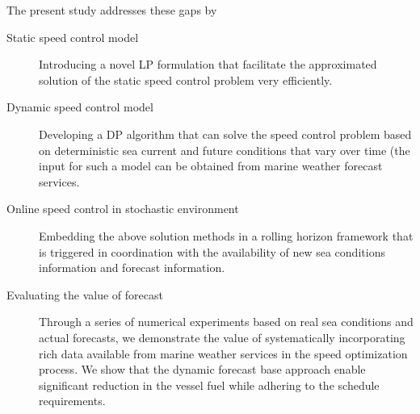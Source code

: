 \documentclass[review,authoryear]{elsarticle}  %
\newcommand{\revadd}[1]{\textcolor{blue}{#1}}
\newcommand{\revdel}[1]{\textcolor{red}{\sout{#1}}}
\newcommand{\revrep}[2]{\revdel{#2}\revadd{#1}}
\begin{document}
The present study addresses these gaps by %


\begin{description}
    \item[Static speed control model]  Introducing a novel LP formulation that facilitate the approximated solution of the static speed control problem very efficiently.
    \item[Dynamic speed control model]  Developing a DP algorithm that can solve the speed control problem based on deterministic sea current and future conditions that vary over time  (the input for such a model can be obtained from marine weather forecast services.
    \item[Online speed control in stochastic environment] Embedding the above solution methods in a rolling horizon framework that is triggered in coordination with the availability of new sea conditions information and forecast information.
    \item[Evaluating the value of forecast]  Through a series of numerical experiments based on real sea conditions and actual forecasts, we demonstrate the value of systematically incorporating rich data available from marine weather services in the speed optimization process.  We show that the dynamic forecast base approach enable significant reduction in the vessel fuel while adhering to the schedule requirements.  
\end{description}

\end{document}
